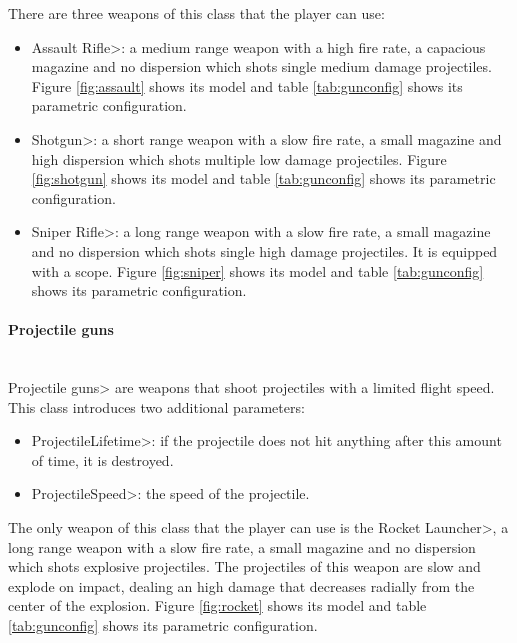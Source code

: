 \par

There are three weapons of this class that the player can use:

\begin{itemize}
\item \<Assault Rifle>: a medium range weapon with a high fire rate, a capacious magazine and no dispersion which shots single medium damage projectiles. Figure \ref{fig:assault} shows its model and table \ref{tab:gunconfig} shows its parametric configuration.
\item \<Shotgun>: a short range weapon with a slow fire rate, a small magazine and high dispersion which shots multiple low damage projectiles. Figure \ref{fig:shotgun} shows its model and table \ref{tab:gunconfig} shows its parametric configuration.
\item \<Sniper Rifle>: a long range weapon with a slow fire rate, a small magazine and no dispersion which shots single high damage projectiles. It is equipped with a scope. Figure \ref{fig:sniper} shows its model and table \ref{tab:gunconfig} shows its parametric configuration.
\end{itemize}

\paragraph{Projectile guns}

\mbox{}\\

{\setlength{\parindent}{0cm}
\<Projectile guns> are weapons that shoot projectiles with a limited flight speed. This class introduces two additional parameters:
}

\begin{itemize}
\item \<ProjectileLifetime>: if the projectile does not hit anything after this amount of time, it is destroyed.
\item \<ProjectileSpeed>: the speed of the projectile.
\end{itemize}

\par

The only weapon of this class that the player can use is the \<Rocket Launcher>, a long range weapon with a slow fire rate, a small magazine and no dispersion which shots explosive projectiles. The projectiles of this weapon are slow and explode on impact, dealing an high damage that decreases radially from the center of the explosion. Figure \ref{fig:rocket} shows its model and table \ref{tab:gunconfig} shows its parametric configuration.

